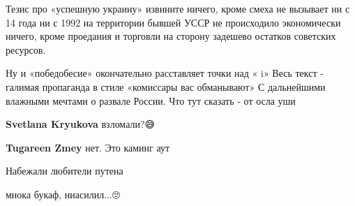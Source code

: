 \begin{itemize}
\begin{itemize}
Тезис про «успешную украину» извините ничего, кроме смеха не вызывает \Smiley[1.0][yellow] ни с
14 года ни с 1992 на территории бывшей УССР не происходило экономически ничего,
кроме проедания и торговли на сторону задешево остатков советских ресурсов. \Smiley[1.0][yellow]

Ну и «победобесие» окончательно расставляет точки над « i» Весь текст - галимая
пропаганда в стиле «комиссары вас обманывают» С дальнейшими влажными мечтами о
развале России. Что тут сказать - от осла уши \Smiley[1.0][yellow]
\end{itemize}

 
\textbf{Svetlana Kryukova} взломали?😅

\begin{itemize}
 
\textbf{Tugareen Zmey} нет. Это каминг аут
\end{itemize}

 
Набежали любители путена

 
мнока букаф, ниасилил...🙄

\begin{itemize}
 

\end{itemize}
\end{itemize}
